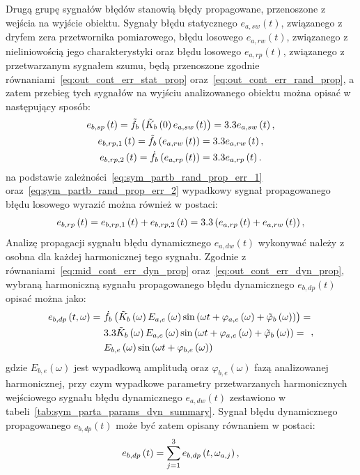 Drugą grupę sygnałów błędów stanowią błędy propagowane, przenoszone z wejścia na wyjście obiektu. Sygnały błędu statycznego $e_{a,sw}(t)$, związanego z dryfem zera przetwornika pomiarowego, błędu losowego $e_{a,rw}(t)$, związanego z nieliniowością jego charakterystyki oraz błędu losowego $e_{a,rp}(t)$, związanego z przetwarzanym sygnałem szumu, będą przenoszone zgodnie równaniami~\eqref{eq:out_cont_err_stat_prop} oraz~\eqref{eq:out_cont_err_rand_prop}, a zatem przebieg tych sygnałów na wyjściu analizowanego obiektu można opisać w następujący sposób:
\begin{gather}
e_{b,sp} \left(t\right) = \tilde{f}_{b} \left( \tilde{K}_{b} \left(0\right) e_{a,sw} \left(t\right) \right) = 3.3 e_{a,sw} \left(t\right) \label{eq:sym_partb_stat_prop_err}, \\
e_{b,rp,1} \left(t\right) = \tilde{f}_{b} \left( e_{a,rw} \left(t\right) \right) = 3.3 e_{a,rw} \left(t\right) \label{eq:sym_partb_rand_prop_err_1}, \\
e_{b,rp,2} \left(t\right) = \dot{f}_{b} \left( e_{a,rp} \left(t\right) \right) = 3.3 e_{a,rp} \left(t\right) \label{eq:sym_partb_rand_prop_err_2}.
\end{gather}
na podstawie zależności~\eqref{eq:sym_partb_rand_prop_err_1} oraz~\eqref{eq:sym_partb_rand_prop_err_2} wypadkowy sygnał propagowanego błędu losowego wyrazić można również w postaci:
\begin{equation}
e_{b,rp} \left(t\right) = e_{b,rp,1} \left(t\right) + e_{b,rp,2} \left(t\right) = 3.3 \left( e_{a,rp} \left(t\right) + e_{a,rw} \left(t\right) \right) \label{eq:sym_partb_rand_prop_err},
\end{equation}
Analizę propagacji sygnału błędu dynamicznego $e_{a,dw}(t)$ wykonywać należy z osobna dla każdej harmonicznej tego sygnału. Zgodnie z równaniami~\eqref{eq:mid_cont_err_dyn_prop} oraz~\eqref{eq:out_cont_err_dyn_prop}, wybraną harmoniczną sygnału propagowanego błędu dynamicznego $e_{b,dp}(t)$ opisać można jako:
\begin{equation}
\begin{split}
e_{b,dp} \left(t,\omega\right) =~
& \dot{f}_{b} \left( \tilde{K}_{b} \left(\omega\right) E_{a,e} \left(\omega\right) \sin \left( \omega t + \varphi_{a,e} \left(\omega\right) + \tilde{\varphi}_{b} \left(\omega\right) \right) \right) = \\
& 3.3 \tilde{K}_{b} \left(\omega\right) E_{a,e} \left(\omega\right) \sin \left( \omega t + \varphi_{a,e} \left(\omega\right) + \tilde{\varphi}_{b} \left(\omega\right) \right) = \\
& E_{b,e} \left(\omega\right) \sin \left(\omega t + \varphi_{b,e} \left(\omega\right)\right) 
\end{split}
\label{eq:sym_partb_dyn_prop_err},
\end{equation}
gdzie $E_{b,e}(\omega)$ jest wypadkową amplitudą oraz $\varphi_{b,e}(\omega)$ fazą analizowanej harmonicznej, przy czym wypadkowe parametry przetwarzanych harmonicznych wejściowego sygnału błędu dynamicznego $e_{a,dw}(t)$ zestawiono w tabeli~\ref{tab:sym_parta_params_dyn_summary}. Sygnał błędu dynamicznego propagowanego $e_{b,dp}(t)$ może być zatem opisany równaniem w postaci:
\begin{equation}
e_{b,dp} \left(t\right) = \sum _{j = 1} ^{3} e_{b,dp} \left(t,\omega_{a,j}\right) \label{eq:sym_partb_dyn_prop_sum},
\end{equation}

